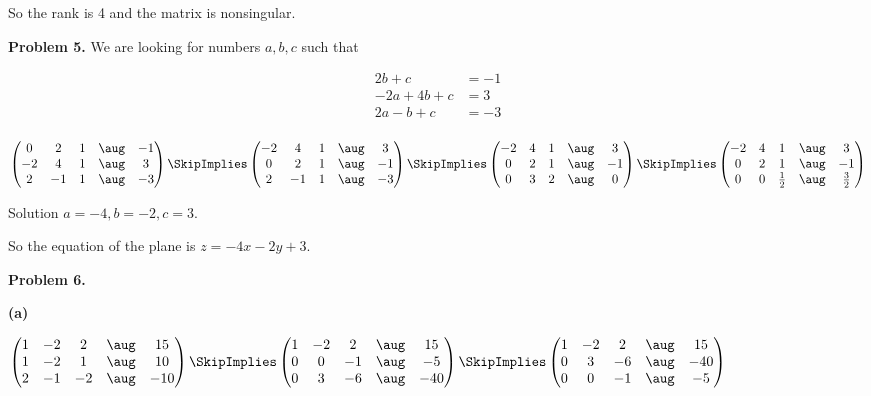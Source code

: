 \documentclass[oneside,12pt]{amsart}
\begin{document}
\bigskip

So the rank is 4 and the matrix is nonsingular.

\bigskip

\textbf{Problem 5.} We are looking for numbers $a,b,c$ such that

\begin{align*}
       2b  + c &= -1 \\
 -2a + 4b  + c &=  3 \\
  2a   -b  + c &= -3 \\
\end{align*}

$
\begin{pmatrix}
0 & 2 & 1  & \aug  &-1 \\
-2 & 4 & 1 & \aug  & 3 \\
2 & -1 & 1 & \aug  &-3
\end{pmatrix}
\SkipImplies
\begin{pmatrix}
-2 & 4 & 1 & \aug  & 3 \\
0 & 2 & 1  & \aug  &-1 \\
2 & -1 & 1 & \aug  &-3
\end{pmatrix}
\SkipImplies
\begin{pmatrix}
-2 & 4 & 1 & \aug  & 3 \\
0 & 2 & 1 &  \aug  & -1 \\
0 & 3 & 2 &  \aug  & 0
\end{pmatrix}
\SkipImplies
\begin{pmatrix}
-2 & 4 & 1           &   \aug &  3 \\
 0 & 2 & 1           &   \aug & -1 \\
 0 & 0 & \frac{1}{2} &   \aug & \frac{3}{2}
\end{pmatrix}
$

\bigskip

Solution $a=-4, b=-2, c=3$.

\bigskip

So the equation of the plane is $z=-4x -2y +3$.

\bigskip


\textbf{Problem 6.}

\bigskip

\textbf{(a)}

\bigskip

$
\begin{pmatrix}
1 & -2 & 2 &  \aug &  15 \\
1 & -2 & 1 &  \aug &  10 \\
2 & -1 & -2 & \aug & -10
\end{pmatrix}
\SkipImplies
\begin{pmatrix}
1 & -2 & 2 &  \aug & 15 \\
0 & 0 & -1 &  \aug & -5 \\
0 & 3 & -6 &  \aug & -40
\end{pmatrix}
\SkipImplies
\begin{pmatrix}
1 & -2 & 2 &  \aug & 15 \\
0 & 3 & -6 &  \aug & -40 \\
0 & 0 & -1 &  \aug & -5 \\
\end{pmatrix}
$
\end{document}
